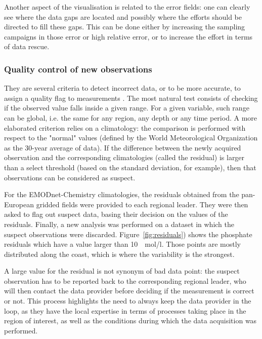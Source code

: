 \documentclass[essd, manuscript]{copernicus}
\begin{document}
Another aspect of the visualisation is related to the error fields: one can clearly see where the data gaps are located and possibly where the efforts should be directed to fill these gaps. This can be done either by increasing the sampling campaigns in those error or high relative error, or to increase the effort in terms of data rescue.

\subsubsection{Quality control of new observations}

They are several criteria to detect incorrect data, or to be more accurate, to assign a quality flag to measurements \citep{CUMMINGS2011,CABANES2021}. The most natural test consists of checking if the observed value falls inside a given range. For a given variable, such range can be global, i.e. the same for any region, any depth or any time period. A more elaborated criterion relies on a climatology: the comparison is performed with respect to the "normal" values (defined by the World Meteorological Organization as the 30-year average of data). If the difference between the newly acquired observation and the corresponding climatologies (called the residual) is larger than a select threshold (based on the standard deviation, for example), then that observations can be considered as suspect.

For the EMODnet-Chemistry climatologies, the residuals obtained from the pan-European gridded fields were provided to each regional leader. They were then asked to flag out suspect data, basing their decision on the values of the residuals. Finally, a new analysis was performed on a dataset in which the suspect observations were discarded. Figure~\ref{fig:residuals}) shows the phosphate residuals which have a value larger than 10~\unit{\mu~mol/l}. Those points are mostly distributed along the coast, which is where the variability is the strongest. 

A large value for the residual is not synonym of bad data point: the suspect observation has to be reported back to the corresponding regional leader, who will then contact the data provider before deciding if the measurement is correct or not. This process highlights the need to always keep the data provider in the loop, as they have the local expertise in terms of processes taking place in the region of interest, as well as the conditions during which the data acquisition was performed. 
\end{document}
